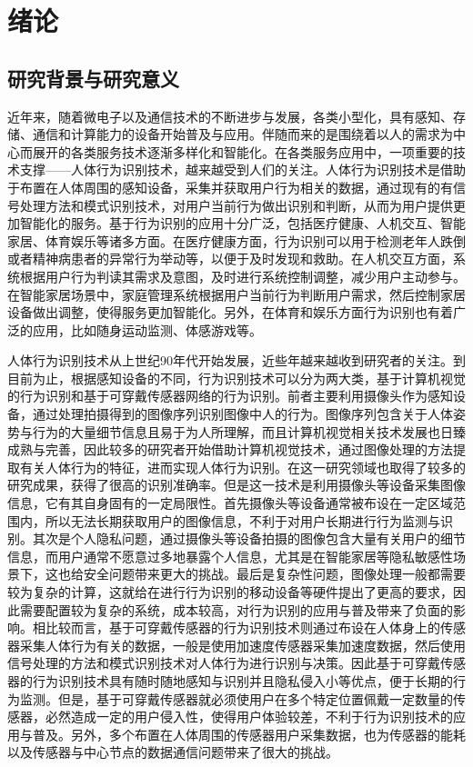 
\chapter{绪论}

\section{研究背景与研究意义}
\par 近年来，随着微电子以及通信技术的不断进步与发展，各类小型化，具有感知、存储、通信和计算能力的设备开始普及与应用。伴随而来的是围绕着以人的需求为中心而展开的各类服务技术逐渐多样化和智能化。在各类服务应用中，一项重要的技术支撑——人体行为识别技术，越来越受到人们的关注。人体行为识别技术是借助于布置在人体周围的感知设备，采集并获取用户行为相关的数据，通过现有的有信号处理方法和模式识别技术，对用户当前行为做出识别和判断，从而为用户提供更加智能化的服务。基于行为识别的应用十分广泛，包括医疗健康、人机交互、智能家居、体育娱乐等诸多方面。在医疗健康方面，行为识别可以用于检测老年人跌倒或者精神病患者的异常行为举动等，以便于及时发现和救助。在人机交互方面，系统根据用户行为判读其需求及意图，及时进行系统控制调整，减少用户主动参与。在智能家居场景中，家庭管理系统根据用户当前行为判断用户需求，然后控制家居设备做出调整，使得服务更加智能化。另外，在体育和娱乐方面行为识别也有着广泛的应用，比如随身运动监测、体感游戏等。

\par 人体行为识别技术从上世纪90年代开始发展\cite{surveyOnSensors}，近些年越来越收到研究者的关注。到目前为止，根据感知设备的不同，行为识别技术可以分为两大类，基于计算机视觉的行为识别和基于可穿戴传感器网络的行为识别。前者主要利用摄像头作为感知设备，通过处理拍摄得到的图像序列识别图像中人的行为\cite{surveyOnVision}。图像序列包含关于人体姿势与行为的大量细节信息且易于为人所理解，而且计算机视觉相关技术发展也日臻成熟与完善，因此较多的研究者开始借助计算机视觉技术，通过图像处理的方法提取有关人体行为的特征，进而实现人体行为识别。在这一研究领域也取得了较多的研究成果，获得了很高的识别准确率。但是这一技术是利用摄像头等设备采集图像信息，它有其自身固有的一定局限性。首先摄像头等设备通常被布设在一定区域范围内，所以无法长期获取用户的图像信息，不利于对用户长期进行行为监测与识别。其次是个人隐私问题，通过摄像头等设备拍摄的图像包含大量有关用户的细节信息，而用户通常不愿意过多地暴露个人信息，尤其是在智能家居等隐私敏感性场景下，这也给安全问题带来更大的挑战。最后是复杂性问题，图像处理一般都需要较为复杂的计算，这就给在进行行为识别的移动设备等硬件提出了更高的要求，因此需要配置较为复杂的系统，成本较高，对行为识别的应用与普及带来了负面的影响。相比较而言，基于可穿戴传感器的行为识别技术\cite{sensorBased}则通过布设在人体身上的传感器采集人体行为有关的数据，一般是使用加速度传感器采集加速度数据，然后使用信号处理的方法和模式识别技术对人体行为进行识别与决策。因此基于可穿戴传感器的行为识别技术具有随时随地感知与识别并且隐私侵入小等优点，便于长期的行为监测。但是，基于可穿戴传感器就必须使用户在多个特定位置佩戴一定数量的传感器，必然造成一定的用户侵入性，使得用户体验较差，不利于行为识别技术的应用与普及。另外，多个布置在人体周围的传感器用户采集数据，也为传感器的能耗以及传感器与中心节点的数据通信问题带来了很大的挑战。

